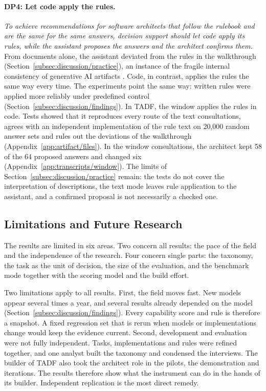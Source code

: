 \paragraph{DP4: Let code apply the rules.}
\emph{To achieve recommendations for software architects that follow the rulebook and are the same for the same answers, decision support should let code apply its rules, while the assistant proposes the answers and the architect confirms them.} From documents alone, the assistant deviated from the rules in the walkthrough (Section~\ref{subsec:discussion/practice}), an instance of the fragile internal consistency of generative AI artifacts \parencite{zurheidenDesignScienceResearch2026}. Code, in contrast, applies the rules the same way every time. The experiments point the same way: written rules were applied more reliably under predefined control (Section~\ref{subsec:discussion/findings}). In TADF, the window applies the rules in code. Tests showed that it reproduces every route of the text consultations, agrees with an independent implementation of the rule text on 20,000 random answer sets and rules out the deviations of the walkthrough (Appendix~\ref{app:artifact/files}). In the window consultations, the architect kept 58 of the 64 proposed answers and changed six (Appendix~\ref{app:transcripts/window}). The limits of Section~\ref{subsec:discussion/practice} remain: the tests do not cover the interpretation of descriptions, the text mode leaves rule application to the assistant, and a confirmed proposal is not necessarily a checked one.

\subsection{Limitations and Future Research}
\label{subsec:discussion/limitations}
\label{subsec:discussion/future}
The results are limited in six areas. Two concern all results: the pace of the field and the independence of the research. Four concern single parts: the taxonomy, the task as the unit of decision, the size of the evaluation, and the benchmark mode together with the scoring model and the build effort. 

Two limitations apply to all results. First, the field moves fast. New models appear several times a year, and several results already depended on the model (Section~\ref{subsec:discussion/findings}). Every capability score and rule is therefore a snapshot. A fixed regression set that is rerun when models or implementations change would keep the evidence current. Second, development and evaluation were not fully independent. Tasks, implementations and rules were refined together, and one analyst built the taxonomy and condensed the interviews. The builder of TADF also took the architect role in the pilots, the demonstration and iterations. The results therefore show what the instrument can do in the hands of its builder. Independent replication is the most direct remedy.

